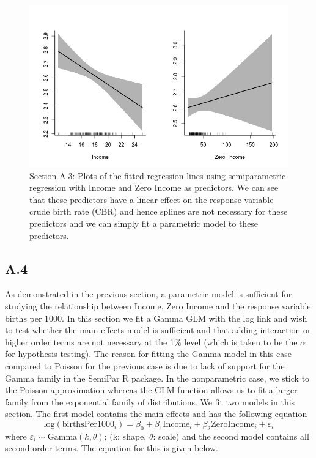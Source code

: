 \documentclass[paper=a4, fontsize=11pt]{scrartcl} %
\numberwithin{equation}{section} %
\begin{document}
\begin{figure}[h]
\centering
\includegraphics[width = 0.8\linewidth]{additive.png}
\caption{Section A.3: Plots of the fitted regression lines using semiparametric regression with Income and Zero Income as predictors. We can see that these predictors have a linear effect on the response variable crude birth rate (CBR) and hence splines are not necessary for these predictors and we can simply fit a parametric model to these predictors.}
\label{additive}
\end{figure}

\subsection{A.4}

As demonstrated in the previous section, a parametric model is sufficient for studying the relationship between Income, Zero Income and the response variable births per 1000. In this section we fit a Gamma GLM with the log link and wish to test whether the main effects model is sufficient and that adding interaction or higher order terms are not necessary at the 1\% level (which is taken to be the $\alpha$ for hypothesis testing). The reason for fitting the Gamma model in this case compared to Poisson for the previous case is due to lack of support for the Gamma family in the SemiPar R package. In the nonparametric case, we stick to the Poisson approximation whereas the GLM function allows us to fit a larger family from the exponential family of distributions. We fit two models in this section. The first model contains the main effects and has the following equation 
$$\text{log}(\text{birthsPer1000}_i) = \beta_0 + \beta_1\text{Income}_i + \beta_2\text{ZeroIncome}_i + \varepsilon_i $$ where $\varepsilon_i  \sim \text{Gamma}(k, \theta)$; (k: shape, $\theta$: scale) and the second model contains all second order terms. The equation for this is given below.
\end{document}
